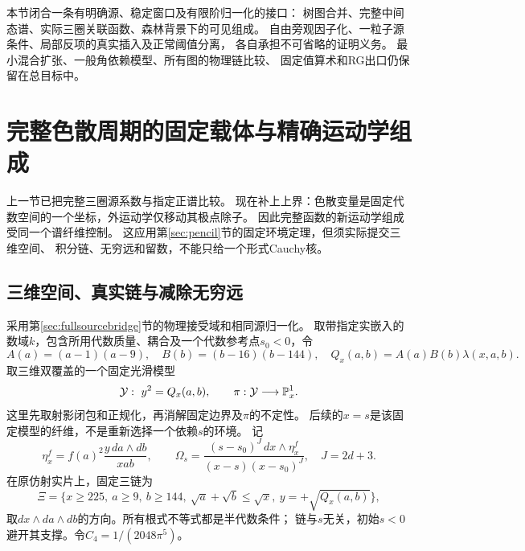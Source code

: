 \documentclass[11pt,a4paper]{ctexart}
\theoremstyle{cnplain}\newtheorem{theorem}{定理}[section]
\theoremstyle{definition}\newtheorem{definition}[theorem]{定义}
\theoremstyle{remark}\newtheorem{remark}[theorem]{注}
\begin{document}
本节闭合一条有明确源、稳定窗口及有限阶归一化的接口：
树图合并、完整中间态谱、实际三圈关联函数、森林背景下的可见组成。
自由旁观因子化、一粒子源条件、局部反项的真实插入及正常阈值分离，
各自承担不可省略的证明义务。
最小混合扩张、一般角依赖模型、所有图的物理链比较、
固定值算术和RG出口仍保留在总目标中。


\section{完整色散周期的固定载体与精确运动学组成}\label{sec:dispersioncarrier}
上一节已把完整三圈源系数与指定正谱比较。
现在补上上界：色散变量是固定代数空间的一个坐标，外运动学仅移动其极点除子。
因此完整函数的新运动学组成受同一个谱纤维控制。
这应用第\ref{sec:pencil}节的固定环境定理，但须实际提交三维空间、
积分链、无穷远和留数，不能只给一个形式Cauchy核。

\subsection{三维空间、真实链与减除无穷远}
采用第\ref{sec:fullsourcebridge}节的物理接受域和相同源归一化。
取带指定实嵌入的数域$k$，包含所用代数质量、耦合及一个代数参考点$s_0<0$，令
\[
 A(a)=(a-1)(a-9),\quad B(b)=(b-16)(b-144),\quad
 Q_x(a,b)=A(a)B(b)\lambda(x,a,b).
\]
取三维双覆盖的一个固定光滑模型
\[
 {\cal Y}:\ y^2=Q_x(a,b),\qquad \pi:{\cal Y}\longrightarrow\mathbb P^1_x .
\]
这里先取射影闭包和正规化，再消解固定边界及$\pi$的不定性。
后续的$x=s$是该固定模型的纤维，不是重新选择一个依赖$s$的环境。
记
\[
 \eta_x^f=f(a)^2\frac{y\,da\wedge db}{xab},\qquad
 \Omega_s=\frac{(s-s_0)^J\,dx\wedge\eta_x^f}
                   {(x-s)(x-s_0)^J},\quad J=2d+3 .
\]
在原仿射实片上，固定三链为
\[
 \Xi=\{x\ge225,\ a\ge9,\ b\ge144,\ \sqrt a+\sqrt b\le\sqrt x,\
              y=+\sqrt{Q_x(a,b)}\},
\]
取$dx\wedge da\wedge db$的方向。所有根式不等式都是半代数条件；
链与$s$无关，初始$s<0$避开其支撑。令$C_4=1/(2048\pi^5)$。
\end{document}
